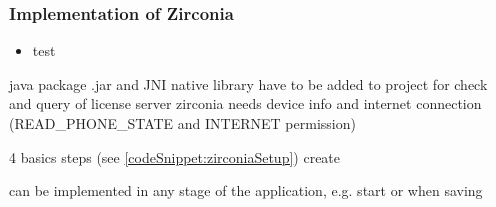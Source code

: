 \subsubsection{Implementation of Zirconia} \label{section:license-samsung-implementation}
\begin{itemize}
    \item test
\end{itemize}
java package .jar and JNI native library have to be added to project
for check and query of license server zirconia needs device info and internet connection (READ\_PHONE\_STATE and INTERNET permission)

4 basics steps (see \ref{codeSnippet:zirconiaSetup})
create

can be implemented in any stage of the application, e.g. start or when saving

\cite{samsungZirconia}
%




